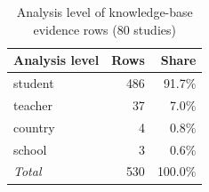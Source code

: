\begin{table}[htbp]
\centering
\footnotesize
\caption{Analysis level of knowledge-base evidence rows (80 studies)}
\label{tab:C9}
\begin{tabular}{lrr}
\toprule
Analysis level & Rows & Share \\
\midrule
student & 486 & 91.7\% \\
teacher & 37 & 7.0\% \\
country & 4 & 0.8\% \\
school & 3 & 0.6\% \\
\textit{Total} & 530 & 100.0\% \\
\bottomrule
\end{tabular}

\end{table}
